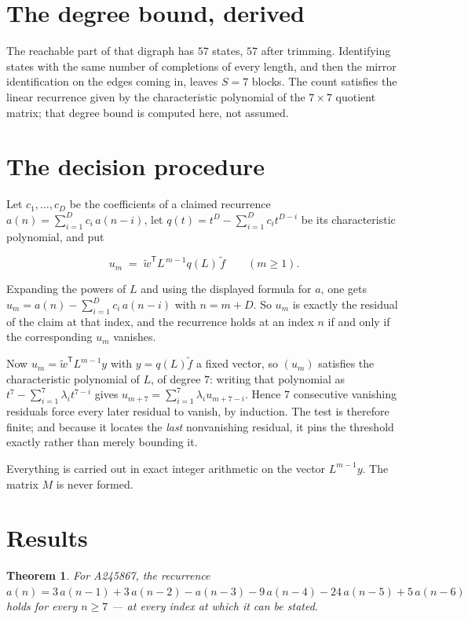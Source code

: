 \documentclass[11pt]{article}
\newtheorem{theorem}{Theorem}
\theoremstyle{definition}
\begin{document}
\section{The degree bound, derived}

The reachable part of that digraph has $57$ states, $57$ after trimming. Identifying states with the same number of completions of every length, and then the mirror identification on the edges coming in, leaves $S = 7$ blocks. The count satisfies the linear recurrence given by the characteristic polynomial of the $7\times7$ quotient matrix; that degree bound is computed here, not assumed.

\section{The decision procedure}

Let $c_1,\dots,c_D$ be the coefficients of a claimed recurrence $a(n) = \sum_{i=1}^{D} c_i\,a(n-i)$, let $q(t) = t^{D} - \sum_{i=1}^{D} c_i t^{D-i}$ be its characteristic polynomial, and put

\[u_m \;=\; \tilde w^{\mathsf T} L^{\,m-1} q(L)\,\tilde f \qquad (m \ge 1).\]

Expanding the powers of $L$ and using the displayed formula for $a$, one gets $u_m = a(n) - \sum_{i=1}^{D} c_i\,a(n-i)$ with $n = m + D$. So $u_m$ is exactly the residual of the claim at that index, and the recurrence holds at an index $n$ if and only if the corresponding $u_m$ vanishes.

Now $u_m = \tilde w^{\mathsf T} L^{m-1} y$ with $y = q(L)\tilde f$ a fixed vector, so $(u_m)$ satisfies the characteristic polynomial of $L$, of degree $7$: writing that polynomial as $t^{7} - \sum_{i=1}^{7} \lambda_i t^{7-i}$ gives $u_{m+7} = \sum_{i=1}^{7} \lambda_i u_{m+7-i}$. Hence $7$ consecutive vanishing residuals force every later residual to vanish, by induction. The test is therefore finite; and because it locates the {\itshape last} nonvanishing residual, it pins the threshold exactly rather than merely bounding it.

Everything is carried out in exact integer arithmetic on the vector $L^{m-1}y$. The matrix $M$ is never formed.

\section{Results}

\begin{theorem} For A245867, the recurrence $a(n) = 3\,a(n-1) + 3\,a(n-2) - a(n-3) - 9\,a(n-4) - 24\,a(n-5) + 5\,a(n-6)$ holds for every $n \ge 7$ --- at every index at which it can be stated.\end{theorem}
\end{document}
